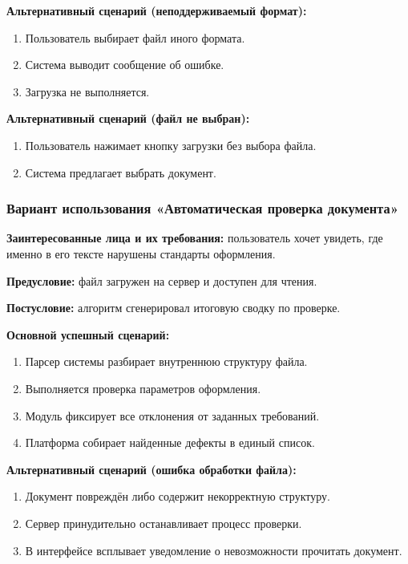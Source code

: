 \textbf{Альтернативный сценарий (неподдерживаемый формат):}

\begin{enumerate}
	\item Пользователь выбирает файл иного формата.
	\item Система выводит сообщение об ошибке.
	\item Загрузка не выполняется.
\end{enumerate}

\textbf{Альтернативный сценарий (файл не выбран):}

\begin{enumerate}
	\item Пользователь нажимает кнопку загрузки без выбора файла.
	\item Система предлагает выбрать документ.
\end{enumerate}

\subsubsection{Вариант использования «Автоматическая проверка документа»}

\textbf{Заинтересованные лица и их требования:} пользователь хочет увидеть, где именно в его тексте нарушены стандарты оформления.

\textbf{Предусловие:} файл загружен на сервер и доступен для чтения.

\textbf{Постусловие:} алгоритм сгенерировал итоговую сводку по проверке.

\textbf{Основной успешный сценарий:}

\begin{enumerate}
	\item Парсер системы разбирает внутреннюю структуру файла.
	\item Выполняется проверка параметров оформления.
	\item Модуль фиксирует все отклонения от заданных требований.
	\item Платформа собирает найденные дефекты в единый список.
\end{enumerate}

\textbf{Альтернативный сценарий (ошибка обработки файла):}

\begin{enumerate}
	\item Документ повреждён либо содержит некорректную структуру.
	\item Сервер принудительно останавливает процесс проверки.
	\item В интерфейсе всплывает уведомление о невозможности прочитать документ.
\end{enumerate}

